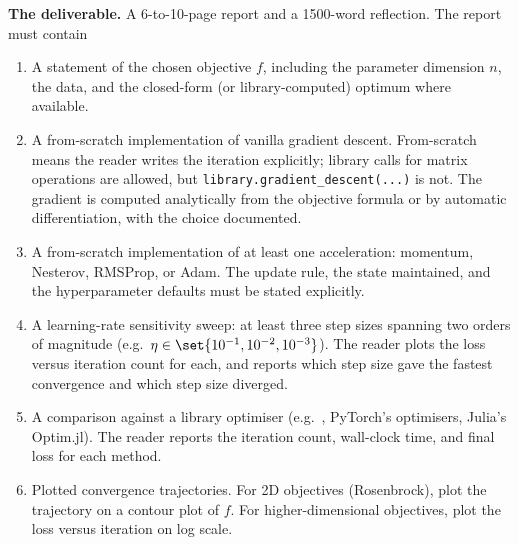 \begin{project}
\textbf{The deliverable.} A 6-to-10-page report and a 1500-word
reflection. The report must contain
\begin{enumerate}[leftmargin=*]
  \item A statement of the chosen objective $f$, including the
    parameter dimension $n$, the data, and the closed-form (or
    library-computed) optimum where available.
  \item A from-scratch implementation of vanilla gradient
    descent. From-scratch means the reader writes the iteration
    explicitly; library calls for matrix operations are allowed,
    but \verb|library.gradient_descent(...)| is not. The gradient
    is computed analytically from the objective formula or by
    automatic differentiation, with the choice documented.
  \item A from-scratch implementation of at least one
    acceleration: momentum, Nesterov, RMSProp, or Adam. The
    update rule, the state maintained, and the hyperparameter
    defaults must be stated explicitly.
  \item A learning-rate sensitivity sweep: at least three step
    sizes spanning two orders of magnitude (e.g.\ $\eta \in
    \set{10^{-1}, 10^{-2}, 10^{-3}}$). The reader plots the loss
    versus iteration count for each, and reports which step size
    gave the fastest convergence and which step size diverged.
  \item A comparison against a library optimiser (e.g.\
    , PyTorch's optimisers,
    Julia's Optim.jl). The reader reports the iteration count,
    wall-clock time, and final loss for each method.
  \item Plotted convergence trajectories. For 2D objectives
    (Rosenbrock), plot the trajectory on a contour plot of $f$.
    For higher-dimensional objectives, plot the loss versus
    iteration on log scale.
\end{enumerate}


\end{project}
